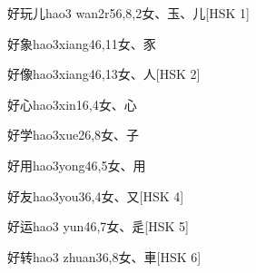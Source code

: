 \begin{EntryWithPhonetic}{好玩儿}{hao3 wan2r5}{6,8,2}{⼥、⽟、⼉}[HSK 1]
\end{EntryWithPhonetic}

\begin{EntryWithPhonetic}{好象}{hao3xiang4}{6,11}{⼥、⾗}
\end{EntryWithPhonetic}

\begin{EntryWithPhonetic}{好像}{hao3xiang4}{6,13}{⼥、⼈}[HSK 2]
\end{EntryWithPhonetic}

\begin{EntryWithPhonetic}{好心}{hao3xin1}{6,4}{⼥、⼼}
\end{EntryWithPhonetic}

\begin{EntryWithPhonetic}{好学}{hao3xue2}{6,8}{⼥、⼦}
\end{EntryWithPhonetic}

\begin{EntryWithPhonetic}{好用}{hao3yong4}{6,5}{⼥、⽤}
\end{EntryWithPhonetic}

\begin{EntryWithPhonetic}{好友}{hao3you3}{6,4}{⼥、⼜}[HSK 4]
\end{EntryWithPhonetic}

\begin{EntryWithPhonetic}{好运}{hao3 yun4}{6,7}{⼥、⾡}[HSK 5]
\end{EntryWithPhonetic}

\begin{EntryWithPhonetic}{好转}{hao3 zhuan3}{6,8}{⼥、⾞}[HSK 6]
\end{EntryWithPhonetic}

